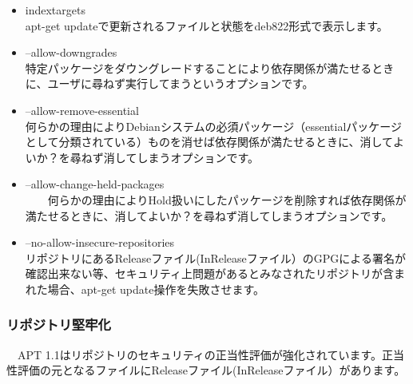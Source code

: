 \documentclass[mingoth,a4paper]{jsarticle}
\begin{document}
 \begin{itemize}
\item indextargets \\
   apt-get updateで更新されるファイルと状態をdeb822形式で表示します。
 \item --allow-downgrades \\
   特定パッケージをダウングレードすることにより依存関係が満たせるときに、ユーザに尋ねず実行してまうというオプションです。
 \item --allow-remove-essential \\
   何らかの理由によりDebianシステムの必須パッケージ（essentialパッケージとして分類されている）ものを消せば依存関係が満たせるときに、消してよいか？を尋ねず消してしまうオプションです。
 \item --allow-change-held-packages \\
　　何らかの理由によりHold扱いにしたパッケージを削除すれば依存関係が満たせるときに、消してよいか？を尋ねず消してしまうオプションです。
　\item --no-allow-insecure-repositories \\
   リポジトリにあるReleaseファイル(InReleaseファイル）のGPGによる署名が確認出来ない等、セキュリティ上問題があるとみなされたリポジトリが含まれた場合、apt-get update操作を失敗させます。
 \end{itemize}
 
 \subsubsection{リポジトリ堅牢化}

　APT 1.1はリポジトリのセキュリティの正当性評価が強化されています。正当性評価の元となるファイルにReleaseファイル(InReleaseファイル）があります。

   
\end{document}
